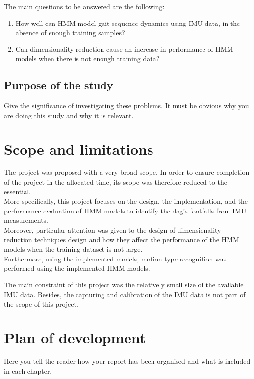 The main questions to be answered are the following:
\begin{enumerate}
	\item How well can HMM model gait sequence dynamics using IMU data, in the absence of enough training samples?
	\item Can dimensionality reduction cause an increase in performance of HMM models when there is not enough training data?
\end{enumerate}
\subsection{Purpose of the study}
Give the significance of investigating these problems. It must be obvious why you are doing this study
and why it is relevant.

\section{Scope and limitations}
The project was proposed with a very broad scope. In order to ensure completion of the project in the allocated time, its scope was therefore reduced to the essential.\\
More specifically, this project focuses on the design, the implementation, and the performance evaluation of HMM models to identify the dog's footfalls from IMU measurements.\\
Moreover, particular attention was given to the design of dimensionality reduction techniques design and how they affect the performance of the HMM models when the training dataset is not large.\\
Furthermore, using the implemented models, motion type recognition was performed using the implemented HMM models.

The main constraint of this project was the relatively small size of the available IMU data.  
Besides, the capturing and calibration of the IMU data is not part of the scope of this project.

\section{Plan of development}
Here you tell the reader how your report has been organised and what is included in each
chapter.
